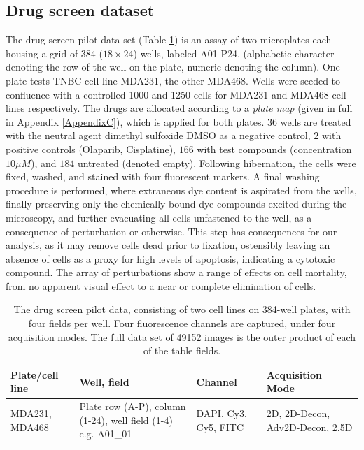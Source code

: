 \subsection{Drug screen dataset}

The drug screen pilot data set (Table \ref{table:drugscreen}) is an assay of two microplates each housing a grid of $384$ ($18 \times 24$) wells, labeled A01-P24, (alphabetic character denoting the row of the well on the plate, numeric denoting the column). One plate tests TNBC cell line MDA231, the other MDA468. Wells were seeded to confluence with a controlled 1000 and 1250 cells for MDA231 and MDA468 cell lines respectively. The drugs are allocated according to a \emph{plate map} (given in full in Appendix \ref{AppendixC}), which is applied for both plates. $36$ wells are treated with the neutral agent dimethyl sulfoxide DMSO as a negative control, $2$ with positive controls (Olaparib, Cisplatine), $166$ with test compounds (concentration $10\mu M$), and $184$ untreated (denoted empty). Following hibernation, the cells were fixed, washed, and stained with four fluorescent markers. A final washing procedure is performed, where extraneous dye content is aspirated from the wells, finally preserving only the chemically-bound dye compounds excited during the microscopy, and further evacuating all cells unfastened to the well, as a consequence of perturbation or otherwise. This step has consequences for our analysis, as it may remove cells dead prior to fixation, ostensibly leaving an absence of cells as a proxy for high levels of apoptosis, indicating a cytotoxic compound. The array of perturbations show a range of effects on cell mortality, from no apparent visual effect to a near or complete elimination of cells.

\begin{table}
\begin{center}
\begin{tabular}{|p{2.5cm}|p{3cm}|p{2.5cm}|p{3cm}|}
\hline
Plate/cell line & Well, field & Channel & Acquisition Mode \\
\hline
MDA231, MDA468 & Plate row (A-P), column (1-24), well field (1-4) e.g. A01\_01 & DAPI, Cy3, Cy5, FITC & 2D, 2D-Decon, Adv2D-Decon, 2.5D \\
\hline
\end{tabular}
\caption{The drug screen pilot data, consisting of two cell lines on 384-well plates, with four fields per well. Four fluorescence channels are captured, under four acquisition modes. The full data set of 49152 images is the outer product of each of the table fields.}
\label{table:drugscreen}
\end{center}
\end{table}

